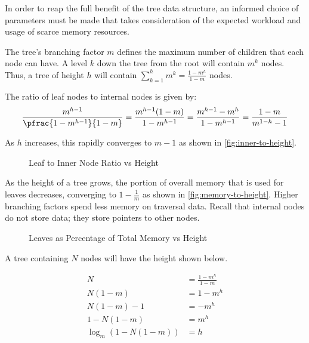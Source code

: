 \label{subsec:system-architecture}

\label{subsec:tree-parameters}


In order to reap the full benefit of the tree data structure, an informed choice
of parameters must be made that takes consideration of the expected workload and
usage of scarce memory resources.

The tree's branching factor $m$ defines the maximum number of children that each
node can have. A level $k$ down the tree from the root will contain $m^k$ nodes.
Thus, a tree of height $h$ will contain
$\sum_{k=1}^h m^k = \frac{1-m^h}{1-m}$ nodes.

The ratio of leaf nodes to internal nodes is given by:
$$
	\frac{m^{h-1}}{\pfrac{1-m^{h-1}}{1-m}}
	= \frac{m^{h-1}(1-m)}{1-m^{h-1}}
	= \frac{m^{h-1}-m^{h}}{1-m^{h-1}}
	= \frac{1-m}{m^{1-h} - 1}
$$

As $h$ increases, this rapidly converges to $m-1$ as shown in
\autoref{fig:inner-to-height}.

\begin{figure}[h]
	\centering
	
	\caption{Leaf to Inner Node Ratio vs Height}
	\label{fig:inner-to-height}
\end{figure}

As the height of a tree grows, the portion of overall memory that is used for
leaves decreases, converging to $1-\frac{1}{m}$ as shown in
\autoref{fig:memory-to-height}. Higher branching factors spend less memory on
traversal data. Recall that internal nodes do not store data; they store
pointers to other nodes.

\begin{figure}[H]
	\centering
	
	\caption{Leaves as Percentage of Total Memory vs Height}
	\label{fig:memory-to-height}
\end{figure}

A tree containing $N$ nodes will have the height shown below.

\begin{align*}
	N &= \frac{1-m^h}{1-m} \\
	N (1-m) &= 1-m^h \\
	N (1-m) - 1 &= -m^h \\
	1 - N (1-m) &= m^h \\
	\log_m\left(1 - N (1-m)\right) &= h
\end{align*}

